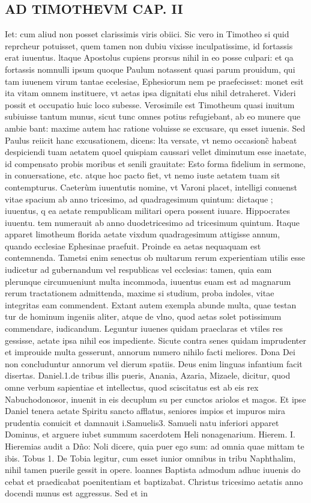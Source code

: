 \documentclass{article}
\begin{document}
\begin{pages}
\section*{AD TIMOTHEVM CAP. II }
\marginpar{[ p.99 ]}\pstart Iet: cum aliud non posset clarissimis viris obiici. Sic vero in Timotheo si quid reprcheur potuisset, quem tamen non dubiu vixisse inculpatissime, id fortassis erat iuuentus. ltaque Apostolus cupiens prorsus nihil in eo posse culpari: et qa fortassis nomnulli ipsum quoque  Paulum notassent quasi parum prouidum, qui tam iuuenem virum tantae ecelesiae, Ephesiorum nem pe praefecisset: monet esit ita vitam omnem instituere, vt aetas ipsa dignitati elus nihil detraheret. Videri possit et occupatio huic loco subesse. Verosimile est Timotheum quasi inuitum subiuisse tantum munus, sicut tunc omnes potius refugiebant, ab eo munere que ambie bant: maxime autem hac ratione voluisse se excusare, qu esset iuuenis. Sed Paulus reiicit hanc excusationem, dicens: lta versate, vt nemo occasionc̃ habeat despiciendi tuam aetatem quoel quispiam caussari vellet diminutum esse inaetate, id compensato probis moribus et senili grauitate: Esto forma fidelium in sermone, in conuersatione, etc. atque hoc pacto fiet, vt nemo iuste aetatem tuam sit contempturus. Caeterùm iuuentutis nomine, vt Varoni placet, intelligi conuenst vitae spacium ab anno tricesimo, ad quadragesimum quintum: dictaque ; iuuentus, q ea aetate rempublicam militari opera possent iuuare. Hippocrates iuuentu. tem numerauit ab anno duodetricesimo ad tricesimum quintum. Itaque apparet limotheum florida aetate vixdum quadragesimum attigisse annum, quando ecclesiae Ephesinae praefuit. Proinde ea aetas nequaquam est contemnenda. Tametsi enim senectus ob multarum rerum experientiam utilis esse iudicetur ad gubernandum vel respublicas vel ecclesias: tamen, quia eam plerunque circumueniunt multa incommoda, iuuentus euam est ad magnarum rerum tractationem admittenda, maxime si studium, proba indoles, vitae integritas eam commendent. Extant autem exempla abunde multa, quae testan tur de hominum ingeniis aliter, atque de vlno, quod aetas solet potissimum commendare, iudicandum. Leguntur iuuenes quidam praeclaras et vtiles res gessisse, aetate ipsa nihil eos impediente. Sicute contra senes quidam imprudenter et improuide multa gesserunt, annorum numero nihilo facti meliores. Dona Dei non concluduntur annorum vel dierum spatiis. Deus enim linguas infantium facit disertas. Daniel.1.de tribus illis pueris, Anania, Azaria, Mizaele, dicitur, quod omne verbum sapientiae et intellectus, quod sciscitatus est ab eis rex Nabuchodonosor, inuenit in eis decuplum su per cunctos ariolos et magos. Et ipse Daniel tenera aetate Spiritu sancto afflatus, seniores impios et impuros mira prudentia conuicit et damnauit i.Samuelis3. Samueli natu inferiori apparet Dominus, et arguere iubet summum sacerdotem Heli nonagenarium. Hierem. I. Hieremias audit a Dño: Noli dicere, quia puer ego sum: ad omnia quae mittam te ibis. Tobus 1. De Tobia legitur, cum esset iunior omnibus in tribu Naphthalim, nihil tamen puerile gessit in opere. loannes Baptista admodum adhuc iuuenis do cebat et praedicabat poenitentiam et baptizabat. Christus tricesimo aetatis anno docendi munus est aggressus. Sed et in 
\end{pages}
\end{document}
